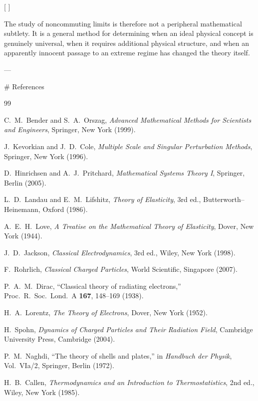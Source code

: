 [
]

The study of noncommuting limits is therefore not a peripheral mathematical subtlety. It is a general method for determining when an ideal physical concept is genuinely universal, when it requires additional physical structure, and when an apparently innocent passage to an extreme regime has changed the theory itself.

---

# References

\begin{thebibliography}{99}

C.~M.~Bender and S.~A.~Orszag,
\emph{Advanced Mathematical Methods for Scientists and Engineers},
Springer, New York (1999).

J.~Kevorkian and J.~D.~Cole,
\emph{Multiple Scale and Singular Perturbation Methods},
Springer, New York (1996).

D.~Hinrichsen and A.~J.~Pritchard,
\emph{Mathematical Systems Theory I},
Springer, Berlin (2005).

L.~D.~Landau and E.~M.~Lifshitz,
\emph{Theory of Elasticity},
3rd ed., Butterworth--Heinemann, Oxford (1986).

A.~E.~H.~Love,
\emph{A Treatise on the Mathematical Theory of Elasticity},
Dover, New York (1944).

J.~D.~Jackson,
\emph{Classical Electrodynamics},
3rd ed., Wiley, New York (1998).

F.~Rohrlich,
\emph{Classical Charged Particles},
World Scientific, Singapore (2007).

P.~A.~M.~Dirac,
``Classical theory of radiating electrons,''
Proc.\ R.\ Soc.\ Lond.\ A \textbf{167}, 148--169 (1938).

H.~A.~Lorentz,
\emph{The Theory of Electrons},
Dover, New York (1952).

H.~Spohn,
\emph{Dynamics of Charged Particles and Their Radiation Field},
Cambridge University Press, Cambridge (2004).

P.~M.~Naghdi,
``The theory of shells and plates,''
in \emph{Handbuch der Physik}, Vol.~VIa/2,
Springer, Berlin (1972).

H.~B.~Callen,
\emph{Thermodynamics and an Introduction to Thermostatistics},
2nd ed., Wiley, New York (1985).


\end{thebibliography}
